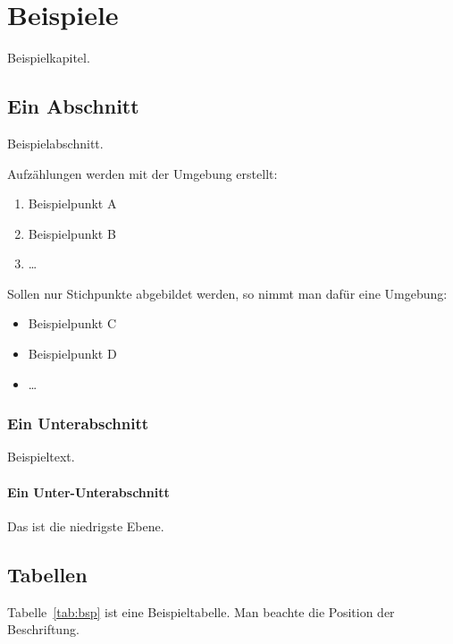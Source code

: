 \chapter{Beispiele}\label{beispiel}

Beispielkapitel.
\lipsum[2]

\section{Ein Abschnitt}
Beispielabschnitt.

Aufzählungen werden mit der  Umgebung erstellt:
\begin{enumerate}
  \item{Beispielpunkt A}
  \item{Beispielpunkt B}
  \item{\ldots}
\end{enumerate}

Sollen nur Stichpunkte abgebildet werden, so nimmt man dafür eine  Umgebung:
\begin{itemize}
  \item{Beispielpunkt C}
  \item{Beispielpunkt D}
  \item{\ldots}
\end{itemize}

\subsection{Ein Unterabschnitt}

Beispieltext.

\subsubsection{Ein Unter-Unterabschnitt}

Das ist die niedrigste Ebene.

\section{Tabellen}

Tabelle~\ref{tab:bsp} ist eine Beispieltabelle.
Man beachte die Position der Beschriftung.
\lipsum[1]

\begin{table}[!htbp]
  \caption{Beispieltabelle}\label{tab:bsp}
\end{table}

